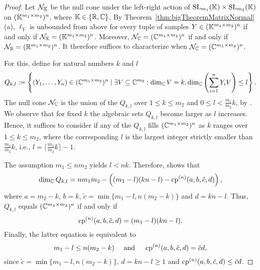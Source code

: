 \begin{proof}
	Let $\mathcal{N}_{\mathbb K}$ be the null cone under the left-right action of $\operatorname{SL}_{m_1}(\mathbb K) \times \operatorname{SL}_{m_2}(\mathbb K)$ on $(\mathbb K^{m_1 \times m_2})^n$, where $\mathbb K \in \{ \mathbb R, \mathbb C\}$.
	By Theorem~\ref{thm:bigTheoremMatrixNormal}(a), $\ell_Y$ is unbounded from above for every tuple of samples $Y \in (\mathbb K^{m_1 \times m_2})^n$ if and only if $\mathcal{N}_{\mathbb K} = (\mathbb K^{m_1 \times m_2})^n$.
	Moreover, $\mathcal{N}_{\mathbb C} = (\mathbb C^{m_1 \times m_2})^n$ if and only if $\mathcal{N}_{\mathbb R} = (\mathbb R^{m_1 \times m_2})^n$.
	It therefore suffices to characterize when $\mathcal{N}_{\mathbb C} = (\mathbb C^{m_1 \times m_2})^n$.
	
	For this, define for natural numbers $k$ and $l$
	{\small \begin{equation*}
		Q_{k,l} := \left\lbrace (Y_1, \ldots, Y_n) \in (\mathbb C^{m_1 \times m_2})^n \mid 
		\exists V \subseteq \mathbb C^{m_2}: 
		\dim_{\mathbb C} V = k,
		\dim_{\mathbb C} \left( \sum_{i=1}^n Y_i V \right) \leq l
		\right\rbrace.
	\end{equation*}}The null cone $\mathcal{N}_{\mathbb C}$ is the union of the $Q_{k,l}$ over $1 \leq k \leq m_2$ and $0 \leq l < \frac{m_1}{m_2} k$, 
	by \cite[Theorem~2.1]{BurginDraisma}. We observe that for fixed $k$ the algebraic sets $Q_{k,l}$ become larger as $l$ increases. Hence, it suffices to consider if any of the $Q_{k,l}$ fills $(\mathbb C^{m_1 \times m_2})^n$ as $k$ ranges over $1 \leq k \leq m_2$, where the corresponding $l$ is the largest integer strictly smaller than $\frac{m_1}{m_2}k$, i.e., $l = \lceil \frac{m_1}{m_2} k \rceil - 1$.
	
	The assumption $m_1 \leq nm_2$ yields $l < nk$. Therefore, \cite[Proposition 2.4]{BurginDraisma} shows that
	\begin{align*}
		\dim_{\mathbb C} Q_{k,l} = n m_1 m_2 - \left( (m_1-l)(kn-l)- \operatorname{cp}^{(n)}(a,b,\tilde{c},d)  \right),
	\end{align*}    
	where $a = m_2 - k$, $b=k$, $\tilde{c} = \min \{ m_1 - l, n (m_2-k) \}$ and $d = kn-l$. Thus, $Q_{k,l}$ equals $(\mathbb C^{m_1 \times m_2})^n$ if and only if    
	\begin{equation*}
		\operatorname{cp}^{(n)}(a,b,\tilde{c},d) = (m_1-l)(kn-l).
	\end{equation*}
	Finally, the latter equation is equivalent to
	\begin{equation*}
		m_1 - l \leq n (m_2-k) \quad \text{ and } \quad \operatorname{cp}^{(n)}(a,b,\tilde{c},d) = \tilde{c}d,
	\end{equation*}
	since $\tilde{c} = \min \{ m_1 - l, n (m_2-k) \}$, $d = kn-l \geq 1$ and $\operatorname{cp}^{(n)}(a,b,\tilde{c},d) \leq \tilde{c}d$.
\end{proof}

